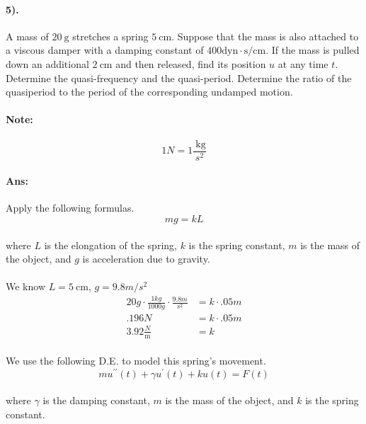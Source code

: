 \documentclass{article}
\begin{document}
\paragraph{5).} A mass of $20 \mathrm{~g}$ stretches a spring $5 \mathrm{~cm}$. Suppose
that the mass is also attached to a viscous damper with a damping constant of
$400 \mathrm{dyn} \cdot \mathrm{s} / \mathrm{cm}$. If the mass is pulled down
an additional $2 \mathrm{~cm}$ and then released, find its position $u$ at any
time $t$. Determine the quasi-frequency and the
quasi-period. Determine the ratio of the quasiperiod to the period of the
corresponding undamped motion. 
\paragraph{Note:} 
\[
   1N = 1 \frac{\mathrm{~kg}}{s^2}
\]

\paragraph{Ans:}Apply the following formulas.
\[
    mg = kL
\]
\paragraph{} where $L$ is the elongation of the spring, $k$ is the spring constant, $m$ is the mass of
the object, and $g$ is acceleration due to gravity.
\paragraph{}We know $L = 5\mathrm{~cm}$, $g = 9.8m/s^2$
\begin{align*}
    20g\cdot \frac{1kg}{1000g} \cdot \frac{9.8m}{s^2} &= k \cdot .05m\\
    .196N &= k\cdot .05m\\
    3.92 \frac{N}{\mathrm{m}} &= k
\end{align*}
\paragraph{}We use the following D.E. to model this spring's movement.
\[
    mu^{\prime\prime}(t) + \gamma u^{\prime}(t) +k u(t) = F(t)
\]

\paragraph{}where $\gamma$ is the damping constant, $m$ is the mass of the object, and $k$ is the
spring constant.
\end{document}
